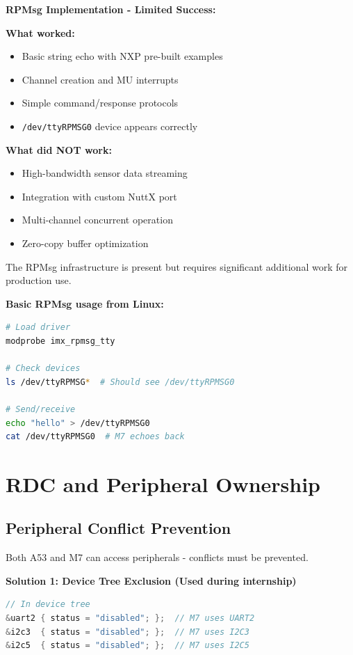 \documentclass[12pt,a4paper]{report}
\begin{document}
\begin{important}
\textbf{RPMsg Implementation - Limited Success:}

\textbf{What worked:}
\begin{itemize}
    \item Basic string echo with NXP pre-built examples
    \item Channel creation and MU interrupts
    \item Simple command/response protocols
    \item \texttt{/dev/ttyRPMSG0} device appears correctly
\end{itemize}

\textbf{What did NOT work:}
\begin{itemize}
    \item High-bandwidth sensor data streaming
    \item Integration with custom NuttX port
    \item Multi-channel concurrent operation
    \item Zero-copy buffer optimization
\end{itemize}

The RPMsg infrastructure is present but requires significant additional work for production use.
\end{important}

\textbf{Basic RPMsg usage from Linux:}
\begin{lstlisting}[language=bash]
# Load driver
modprobe imx_rpmsg_tty

# Check devices
ls /dev/ttyRPMSG*  # Should see /dev/ttyRPMSG0

# Send/receive
echo "hello" > /dev/ttyRPMSG0
cat /dev/ttyRPMSG0  # M7 echoes back
\end{lstlisting}

\section{RDC and Peripheral Ownership}

\subsection{Peripheral Conflict Prevention}

Both A53 and M7 can access peripherals - conflicts must be prevented.

\textbf{Solution 1: Device Tree Exclusion (Used during internship)}

\begin{lstlisting}[language=c]
// In device tree
&uart2 { status = "disabled"; };  // M7 uses UART2
&i2c3  { status = "disabled"; };  // M7 uses I2C3
&i2c5  { status = "disabled"; };  // M7 uses I2C5
\end{lstlisting}
\end{document}
